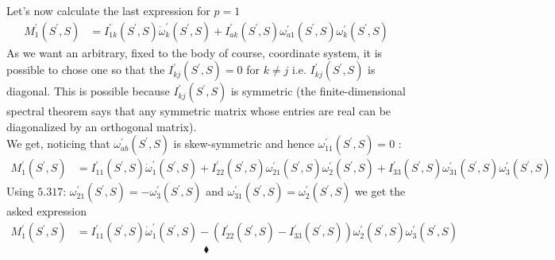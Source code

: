 Let's now calculate the last expression for $p=1$
\begin{align}
M^{'}_1(S^{'},S) &=I^{'}_{1k}(S^{'},S) \dot{\omega}^{'}_{k}(S^{'},S)+ I^{'}_{ak}(S^{'},S)\omega^{'}_{a1}(S^{'},S)\omega^{'}_{k}(S^{'},S)
\end{align}
As we want an arbitrary, fixed to the body of course, coordinate system, it is possible to chose one so that the $I^{'}_{kj}(S^{'},S) = 0 $ for $k\neq j$ i.e. $I^{'}_{kj}(S^{'},S) $ is diagonal. This is possible because $ I^{'}_{kj}(S^{'},S) $ is symmetric (the finite-dimensional spectral theorem says that any symmetric matrix whose entries are real can be diagonalized by an orthogonal matrix).\\
We get, noticing that $\omega^{'}_{ab}(S^{'},S)$ is skew-symmetric and hence $\omega^{'}_{11}(S^{'},S) = 0$ :
\begin{align}
M^{'}_1(S^{'},S) &= I^{'}_{11}(S^{'},S) \dot{\omega}^{'}_{1}(S^{'},S)+ I^{'}_{22}(S^{'},S)\omega^{'}_{21}(S^{'},S)\omega^{'}_{2}(S^{'},S)+ I^{'}_{33}(S^{'},S)\omega^{'}_{31}(S^{'},S)\omega^{'}_{3}(S^{'},S)
\end{align}
Using $\mathbf{5.317}$:  $\omega^{'}_{21}(S^{'},S)=-\omega^{'}_{3}(S^{'},S)$ and $\omega^{'}_{31}(S^{'},S)=\omega^{'}_{2}(S^{'},S)$  we get the asked expression 
\begin{align}
M^{'}_1(S^{'},S) &= I^{'}_{11}(S^{'},S) \dot{\omega}^{'}_{1}(S^{'},S)-\left( I^{'}_{22}(S^{'},S)- I^{'}_{33}(S^{'},S)\right)\omega^{'}_{2}(S^{'},S)\omega^{'}_{3}(S^{'},S)
\end{align}
$$\blacklozenge$$
\newpage


